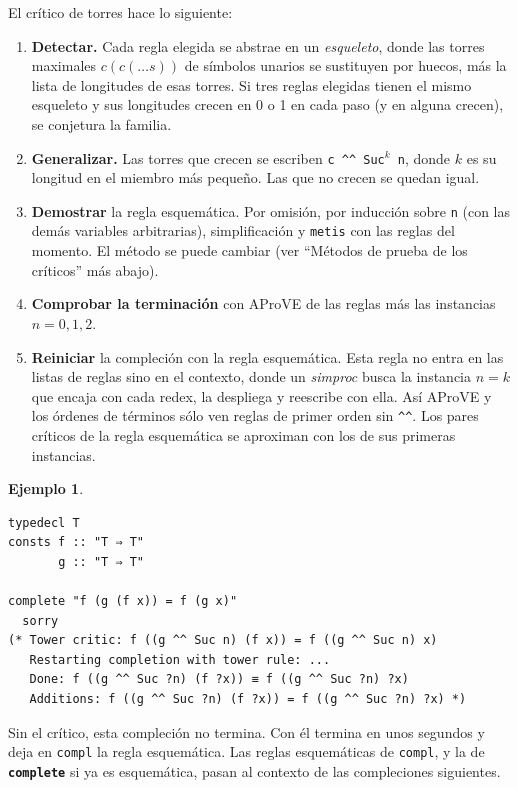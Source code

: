 \documentclass[11pt,a4paper]{article}
\newcommand{\isa}[1]{\texttt{#1}}
\newcommand{\cmd}[1]{\textbf{\texttt{#1}}}
\theoremstyle{definition}
\newtheorem{ejemplo}[definicion]{Ejemplo}
\theoremstyle{remark}
\begin{document}
El crítico de torres hace lo siguiente:
\begin{enumerate}[nosep]
  \item \textbf{Detectar.} Cada regla elegida se abstrae en un \emph{esqueleto},
        donde las torres maximales $c(c(\dots s))$ de símbolos unarios se
        sustituyen por huecos, más la lista de longitudes de esas torres. Si tres
        reglas elegidas tienen el mismo esqueleto y sus longitudes crecen en 0 o 1
        en cada paso (y en alguna crecen), se conjetura la familia.
  \item \textbf{Generalizar.} Las torres que crecen se escriben
        \isa{c \textasciicircum\textasciicircum\ Suc$^k$ n}, donde $k$ es su
        longitud en el miembro más pequeño. Las que no crecen se quedan igual.
  \item \textbf{Demostrar} la regla esquemática. Por omisión, por inducción sobre
        \isa{n} (con las demás variables arbitrarias), simplificación y
        \isa{metis} con las reglas del momento. El método se puede cambiar
        (ver ``Métodos de prueba de los críticos'' más abajo).
  \item \textbf{Comprobar la terminación} con AProVE de las reglas más las
        instancias $n = 0, 1, 2$.
  \item \textbf{Reiniciar} la compleción con la regla esquemática. Esta regla no
        entra en las listas de reglas sino en el contexto, donde un
        \emph{simproc} busca la instancia $n = k$ que encaja con cada redex, la
        despliega y reescribe con ella. Así AProVE y los órdenes de términos sólo ven reglas
        de primer orden sin \isa{\textasciicircum\textasciicircum}. Los pares
        críticos de la regla esquemática se aproximan con los de sus primeras
        instancias.
\end{enumerate}

\begin{ejemplo}
\begin{lstlisting}
typedecl T
consts f :: "T ⇒ T"
       g :: "T ⇒ T"

complete "f (g (f x)) = f (g x)"
  sorry
(* Tower critic: f ((g ^^ Suc n) (f x)) = f ((g ^^ Suc n) x)
   Restarting completion with tower rule: ...
   Done: f ((g ^^ Suc ?n) (f ?x)) ≡ f ((g ^^ Suc ?n) ?x)
   Additions: f ((g ^^ Suc ?n) (f ?x)) = f ((g ^^ Suc ?n) ?x) *)
\end{lstlisting}
Sin el crítico, esta compleción no termina. Con él termina en unos segundos y deja
en \isa{compl} la regla esquemática. Las reglas esquemáticas de \isa{compl}, y la
de \cmd{complete} si ya es esquemática, pasan al contexto de las compleciones
siguientes.
\end{ejemplo}
\end{document}
